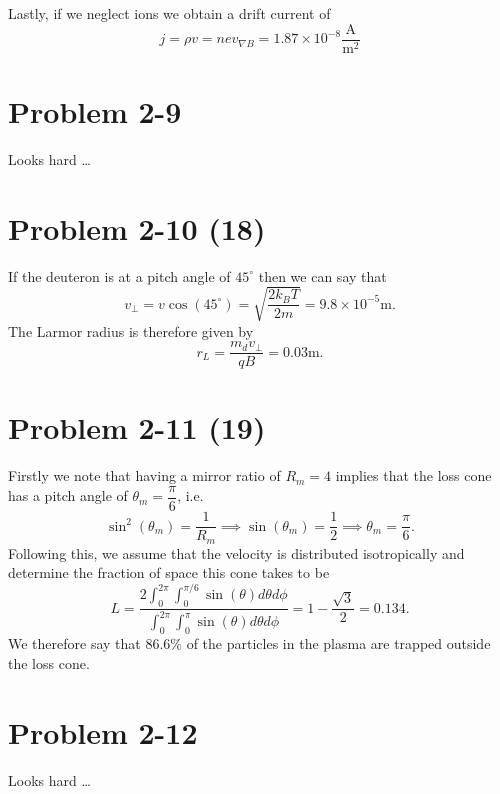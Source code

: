 Lastly, if we neglect ions we obtain a drift current of
\begin{equation}
	j = \rho v = nev_{\nabla B} = 1.87 \times 10^{-8} \dfrac{\text{A}}{\text{m}^2}
\end{equation}

\section*{Problem 2-9}
\label{sec:2-9}
Looks hard \dots

\section*{Problem 2-10 (18)}
\label{sec:2-10}
If the deuteron is at a pitch angle of \(45^\circ \) then we can say that
\begin{equation}
	v_\perp = v\cos(45^\circ) = \sqrt{\dfrac{2k_BT}{2m}} = 9.8 \times 10^{-5}\text{m}.
\end{equation}
The Larmor radius is therefore given by
\begin{equation}
	r_L = \dfrac{m_d v_\perp}{qB} = 0.03\text{m}.
\end{equation}

\section*{Problem 2-11 (19)}
\label{sec:2-11}
Firstly we note that having a mirror ratio of \(R_m = 4\) implies that the loss cone has a pitch angle of \(\theta_m = \dfrac{\pi}{6} \), i.e.
\begin{equation}
	\sin^2(\theta_m) = \dfrac{1}{R_m} \implies \sin(\theta_m) = \dfrac{1}{2} \implies \theta_m = \dfrac{\pi}{6}.
\end{equation}
Following this, we assume that the velocity is distributed isotropically and determine the fraction of space this cone takes to be
\begin{equation}
	L = \dfrac{2\int_0^{2\pi}\int_0^{\pi/6}\sin(\theta)d\theta d\phi}{\int_0^{2\pi}\int_0^{\pi}\sin(\theta)d\theta d\phi} = 1-\dfrac{\sqrt{3}}{2} = 0.134.
\end{equation}
We therefore say that \(86.6\% \) of the particles in the plasma are trapped outside the loss cone.

\section*{Problem 2-12}
\label{sec:2-12}
Looks hard \dots

